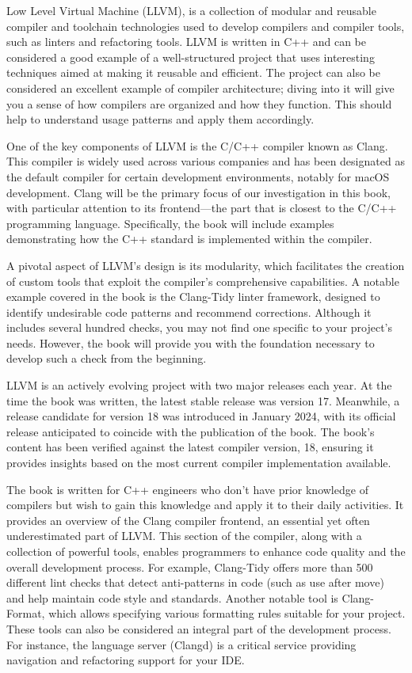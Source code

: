 Low Level Virtual Machine (LLVM), is a collection of modular and reusable compiler and toolchain technologies used to develop compilers and compiler tools, such as linters and refactoring tools. LLVM is written in C++ and can be considered a good example of a well-structured project that uses interesting techniques aimed at making it reusable and efficient. The project can also be considered an excellent example of compiler architecture; diving into it will give you a sense of how compilers are organized and how they function. This should help to understand usage patterns and apply them accordingly.

One of the key components of LLVM is the C/C++ compiler known as Clang. This compiler is widely used across various companies and has been designated as the default compiler for certain development environments, notably for macOS development. Clang will be the primary focus of our investigation in this book, with particular attention to its frontend—the part that is closest to the C/C++ programming language. Specifically, the book will include examples demonstrating how the C++ standard is implemented within the compiler.

A pivotal aspect of LLVM’s design is its modularity, which facilitates the creation of custom tools that exploit the compiler’s comprehensive capabilities. A notable example covered in the book is the Clang-Tidy linter framework, designed to identify undesirable code patterns and recommend corrections. Although it includes several hundred checks, you may not find one specific to your project’s needs. However, the book will provide you with the foundation necessary to develop such a check from the beginning.

LLVM is an actively evolving project with two major releases each year. At the time the book was written, the latest stable release was version 17. Meanwhile, a release candidate for version 18 was introduced in January 2024, with its official release anticipated to coincide with the publication of the book. The book’s content has been verified against the latest compiler version, 18, ensuring it provides insights based on the most current compiler implementation available.


The book is written for C++ engineers who don’t have prior knowledge of compilers but wish to gain this knowledge and apply it to their daily activities. It provides an overview of the Clang compiler frontend, an essential yet often underestimated part of LLVM. This section of the compiler, along with a collection of powerful tools, enables programmers to enhance code quality and the overall development process. For example, Clang-Tidy offers more than 500 different lint checks that detect anti-patterns in code (such as use after move) and help maintain code style and standards. Another notable tool is Clang-Format, which allows specifying various formatting rules suitable for your project. These tools can also be considered an integral part of the development process. For instance, the language server (Clangd) is a critical service providing navigation and refactoring support for your IDE.

